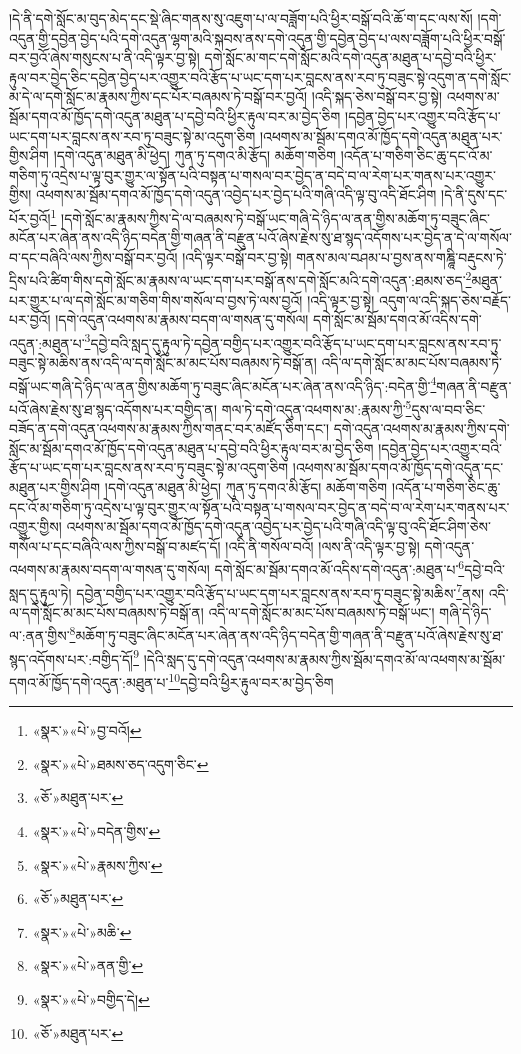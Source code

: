 །དེ་ནི་དགེ་སློང་མ་བུད་མེད་དང་སྡེ་ཞིང་གནས་སུ་འཇུག་པ་ལ་བཟློག་པའི་ཕྱིར་བསྒོ་བའི་ཆོ་ག་དང་ལས་སོ། །དགེ་འདུན་གྱི་དབྱེན་བྱེད་པའི་དགེ་འདུན་ལྷག་མའི་སྐབས་ནས་དགེ་འདུན་གྱི་དབྱེན་བྱེད་པ་ལས་བཟློག་པའི་ཕྱིར་བསྒོ་བར་བྱའོ་ཞེས་གསུངས་པ་ནི་འདི་ལྟར་བྱ་སྟེ། དགེ་སློང་མ་གང་དགེ་སློང་མའི་དགེ་འདུན་མཐུན་པ་དབྱེ་བའི་ཕྱིར་རྟུལ་བར་བྱེད་ཅིང་དབྱེན་བྱེད་པར་འགྱུར་བའི་རྩོད་པ་ཡང་དག་པར་བླངས་ནས་རབ་ཏུ་བཟུང་སྟེ་འདུག་ན་དགེ་སློང་མ་དེ་ལ་དགེ་སློང་མ་རྣམས་ཀྱིས་དང་པོར་བཞམས་ཏེ་བསྒོ་བར་བྱའོ། །འདི་སྐད་ཅེས་བསྒོ་བར་བྱ་སྟེ། འཕགས་མ་སྦོམ་དགའ་མོ་ཁྱོད་དགེ་འདུན་མཐུན་པ་དབྱེ་བའི་ཕྱིར་རྟུལ་བར་མ་བྱེད་ཅིག །དབྱེན་བྱེད་པར་འགྱུར་བའི་རྩོད་པ་ཡང་དག་པར་བླངས་ནས་རབ་ཏུ་བཟུང་སྟེ་མ་འདུག་ཅིག །འཕགས་མ་སྦོམ་དགའ་མོ་ཁྱོད་དགེ་འདུན་མཐུན་པར་གྱིས་ཤིག །དགེ་འདུན་མཐུན་མི་ཕྱེད། ཀུན་ཏུ་དགའ་མི་རྩོད། མཆོག་གཅིག །འདོན་པ་གཅིག་ཅིང་ཆུ་དང་འོ་མ་གཅིག་ཏུ་འདྲེས་པ་ལྟ་བུར་གྱུར་ལ་སྟོན་པའི་བསྟན་པ་གསལ་བར་བྱེད་ན་བདེ་བ་ལ་རེག་པར་གནས་པར་འགྱུར་གྱིས། འཕགས་མ་སྦོམ་དགའ་མོ་ཁྱོད་དགེ་འདུན་འབྱེད་པར་བྱེད་པའི་གཞི་འདི་ལྟ་བུ་འདི་ཐོང་ཤིག །དེ་ནི་དུས་དང་པོར་བྱའོ།\footnote{«སྣར་»«པེ་»བྱ་བའོ།} །དགེ་སློང་མ་རྣམས་ཀྱིས་དེ་ལ་བཞམས་ཏེ་བསྒོ་ཡང་གཞི་དེ་ཉིད་ལ་ནན་གྱིས་མཆོག་ཏུ་བཟུང་ཞིང་མངོན་པར་ཞེན་ནས་འདི་ཉིད་བདེན་གྱི་གཞན་ནི་བརྫུན་པའོ་ཞེས་རྗེས་སུ་ཐ་སྙད་འདོགས་པར་བྱེད་ན་དེ་ལ་གསོལ་བ་དང་བཞིའི་ལས་ཀྱིས་བསྒོ་བར་བྱའོ། །འདི་ལྟར་བསྒོ་བར་བྱ་སྟེ། གནས་མལ་བཤམ་པ་བྱས་ནས་གཎྜཱི་བརྡུངས་ཏེ་དྲིས་པའི་ཚིག་གིས་དགེ་སློང་མ་རྣམས་ལ་ཡང་དག་པར་བསྒོ་ནས་དགེ་སློང་མའི་དགེ་འདུན་:ཐམས་ཅད་\footnote{«སྣར་»«པེ་»ཐམས་ཅད་འདུག་ཅིང་}མཐུན་པར་གྱུར་པ་ལ་དགེ་སློང་མ་གཅིག་གིས་གསོལ་བ་བྱས་ཏེ་ལས་བྱའོ། །འདི་ལྟར་བྱ་སྟེ། འདུག་ལ་འདི་སྐད་ཅེས་བརྗོད་པར་བྱའོ། །དགེ་འདུན་འཕགས་མ་རྣམས་བདག་ལ་གསན་དུ་གསོལ། དགེ་སློང་མ་སྦོམ་དགའ་མོ་འདིས་དགེ་འདུན་:མཐུན་པ་\footnote{«ཅོ་»མཐུན་པར་}དབྱེ་བའི་སླད་དུ་རྟུལ་ཏེ་དབྱེན་བགྱིད་པར་འགྱུར་བའི་རྩོད་པ་ཡང་དག་པར་བླངས་ནས་རབ་ཏུ་བཟུང་སྟེ་མཆིས་ནས་འདི་ལ་དགེ་སློང་མ་མང་པོས་བཞམས་ཏེ་བསྒོ་ན། འདི་ལ་དགེ་སློང་མ་མང་པོས་བཞམས་ཏེ་བསྒོ་ཡང་གཞི་དེ་ཉིད་ལ་ནན་གྱིས་མཆོག་ཏུ་བཟུང་ཞིང་མངོན་པར་ཞེན་ནས་འདི་ཉིད་:བདེན་གྱི་\footnote{«སྣར་»«པེ་»བདེན་གྱིས་}གཞན་ནི་བརྫུན་པའོ་ཞེས་རྗེས་སུ་ཐ་སྙད་འདོགས་པར་བགྱིད་ན། གལ་ཏེ་དགེ་འདུན་འཕགས་མ་:རྣམས་ཀྱི་\footnote{«སྣར་»«པེ་»རྣམས་ཀྱིས་}དུས་ལ་བབ་ཅིང་བཟོད་ན་དགེ་འདུན་འཕགས་མ་རྣམས་ཀྱིས་གནང་བར་མཛོད་ཅིག་དང་། དགེ་འདུན་འཕགས་མ་རྣམས་ཀྱིས་དགེ་སློང་མ་སྦོམ་དགའ་མོ་ཁྱོད་དགེ་འདུན་མཐུན་པ་དབྱེ་བའི་ཕྱིར་རྟུལ་བར་མ་བྱེད་ཅིག །དབྱེན་བྱེད་པར་འགྱུར་བའི་རྩོད་པ་ཡང་དག་པར་བླངས་ནས་རབ་ཏུ་བཟུང་སྟེ་མ་འདུག་ཅིག །འཕགས་མ་སྦོམ་དགའ་མོ་ཁྱོད་དགེ་འདུན་དང་མཐུན་པར་གྱིས་ཤིག །དགེ་འདུན་མཐུན་མི་ཕྱེད། ཀུན་ཏུ་དགའ་མི་རྩོད། མཆོག་གཅིག །འདོན་པ་གཅིག་ཅིང་ཆུ་དང་འོ་མ་གཅིག་ཏུ་འདྲེས་པ་ལྟ་བུར་གྱུར་ལ་སྟོན་པའི་བསྟན་པ་གསལ་བར་བྱེད་ན་བདེ་བ་ལ་རེག་པར་གནས་པར་འགྱུར་གྱིས། འཕགས་མ་སྦོམ་དགའ་མོ་ཁྱོད་དགེ་འདུན་འབྱེད་པར་བྱེད་པའི་གཞི་འདི་ལྟ་བུ་འདི་ཐོང་ཤིག་ཅེས་གསོལ་པ་དང་བཞིའི་ལས་ཀྱིས་བསྒོ་བ་མཛད་དོ། །འདི་ནི་གསོལ་བའོ། །ལས་ནི་འདི་ལྟར་བྱ་སྟེ། དགེ་འདུན་འཕགས་མ་རྣམས་བདག་ལ་གསན་དུ་གསོལ། དགེ་སློང་མ་སྦོམ་དགའ་མོ་འདིས་དགེ་འདུན་:མཐུན་པ་\footnote{«ཅོ་»མཐུན་པར་}དབྱེ་བའི་སླད་དུ་རྟུལ་ཏེ། དབྱེན་བགྱིད་པར་འགྱུར་བའི་རྩོད་པ་ཡང་དག་པར་བླངས་ནས་རབ་ཏུ་བཟུང་སྟེ་མཆིས་\footnote{«སྣར་»«པེ་»མཆི་}ནས། འདི་ལ་དགེ་སློང་མ་མང་པོས་བཞམས་ཏེ་བསྒོ་ན། འདི་ལ་དགེ་སློང་མ་མང་པོས་བཞམས་ཏེ་བསྒོ་ཡང་། གཞི་དེ་ཉིད་ལ་:ནན་གྱིས་\footnote{«སྣར་»«པེ་»ནན་གྱི་}མཆོག་ཏུ་བཟུང་ཞིང་མངོན་པར་ཞེན་ནས་འདི་ཉིད་བདེན་གྱི་གཞན་ནི་བརྫུན་པའོ་ཞེས་རྗེས་སུ་ཐ་སྙད་འདོགས་པར་:བགྱིད་དོ།\footnote{«སྣར་»«པེ་»བགྱིད་དེ།} །དེའི་སླད་དུ་དགེ་འདུན་འཕགས་མ་རྣམས་ཀྱིས་སྦོམ་དགའ་མོ་ལ་འཕགས་མ་སྦོམ་དགའ་མོ་ཁྱོད་དགེ་འདུན་:མཐུན་པ་\footnote{«ཅོ་»མཐུན་པར་}དབྱེ་བའི་ཕྱིར་རྟུལ་བར་མ་བྱེད་ཅིག 